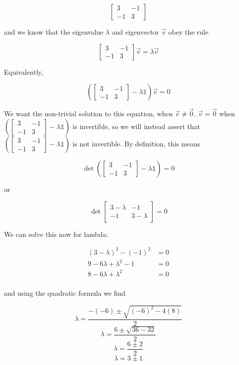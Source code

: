 \documentclass{article}
\begin{document}
$$\begin{bmatrix}
3 	&	-1	\\
-1	&	3	\end{bmatrix}$$

and we know that the eigenvalue $\lambda$ and eigenvector $\vec{v}$ obey the rule

$$\begin{bmatrix}
3 	&	-1	\\
-1	&	3	\end{bmatrix}\vec{v} = \lambda \vec{v}$$

Equivalently, 

$$\left(\begin{bmatrix}
3 	&	-1	\\
-1	&	3	\end{bmatrix} - \lambda\mathbb{1}\right)\vec{v} = 0$$

We want the non-trivial solution to this equation, when $\vec{v} \neq \vec{0}$. $\vec{v} = \vec{0}$ when $\left(\begin{bmatrix}
3 	&	-1	\\
-1	&	3	\end{bmatrix} - \lambda\mathbb{1}\right)$ is invertible, so we will instead assert that $\left(\begin{bmatrix}
3 	&	-1	\\
-1	&	3	\end{bmatrix} - \lambda\mathbb{1}\right)$ is not invertible. By definition, this means 

$$ \det\left(\begin{bmatrix}
3 	&	-1	\\
-1	&	3	\end{bmatrix} - \lambda\mathbb{1}\right) = 0 $$

or 

$$ \det\begin{bmatrix}
3-\lambda	&	-1	\\
-1	&	3-\lambda	\end{bmatrix} = 0 $$

We can solve this now for lambda:


\begin{align*}
(3-\lambda)^2 - (-1)^2 &= 0 \\
9 - 6\lambda + \lambda^2 - 1 &= 0 \\
8 - 6\lambda + \lambda^2 &= 0 \\
\end{align*}

and using the quadratic formula we find

$$ \lambda = \frac{-(-6) \pm \sqrt{(-6)^2 - 4(8)}}{2} $$
$$ \lambda = \frac{6 \pm \sqrt{36 - 32}}{2} $$
$$ \lambda = \frac{6 \pm 2}{2} $$
$$ \lambda = 3 \pm 1$$
\end{document}
